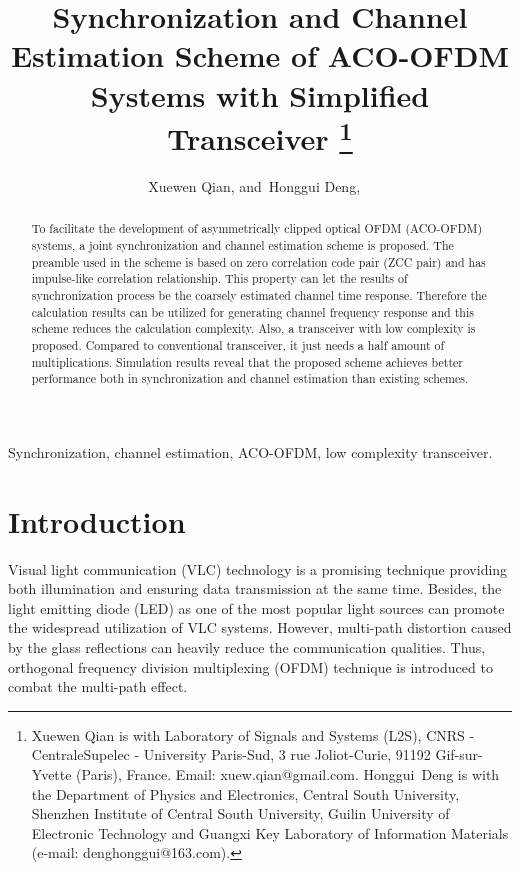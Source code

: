 \documentclass[journal]{IEEEtran}
\begin{document}



\title{ {Synchronization and Channel Estimation Scheme of ACO-OFDM Systems with Simplified Transceiver}
\thanks{Xuewen Qian is with Laboratory of Signals and Systems (L2S), CNRS - CentraleSupelec - University Paris-Sud, 3 rue Joliot-Curie, 91192 Gif-sur-Yvette (Paris), France. Email: xuew.qian@gmail.com. %
Honggui~Deng is with the Department of Physics and Electronics, Central South University, Shenzhen Institute of Central South University, Guilin University of Electronic Technology and Guangxi Key Laboratory of Information Materials (e-mail: denghonggui@163.com). }
}

\author{Xuewen Qian,
        and~Honggui Deng, ~ }



\maketitle
\begin{abstract}
To facilitate the development of asymmetrically clipped optical OFDM (ACO-OFDM) systems, a joint synchronization and channel estimation scheme is proposed. The preamble used in the scheme is based on zero correlation code pair (ZCC pair) and has impulse-like correlation relationship. This property can let the results of synchronization process be the coarsely estimated channel time response. Therefore the calculation results can be utilized for generating channel frequency response and this scheme reduces the calculation complexity. Also, a transceiver with low complexity is proposed. Compared to conventional transceiver, it just needs a half amount of multiplications. Simulation results reveal that the proposed scheme achieves better performance both in synchronization and channel estimation than existing schemes.

\end{abstract}

\begin{IEEEkeywords}
Synchronization, channel estimation, ACO-OFDM, low complexity transceiver.
\end{IEEEkeywords}



\section{Introduction}
Visual light communication (VLC) technology\cite{Chi2015,Qian2016Synchronisation} is a promising technique providing both illumination and ensuring data transmission at the same time. Besides, the light emitting diode (LED) as one of the most popular light sources can promote the widespread utilization of VLC systems. However, multi-path distortion caused by the glass reflections can heavily reduce the communication qualities. Thus, orthogonal frequency division multiplexing (OFDM) technique is introduced to combat the multi-path effect.
\end{document}
